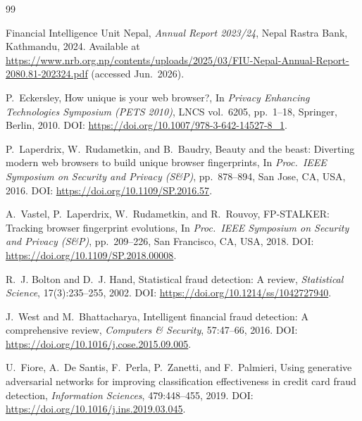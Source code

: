 {\small
\begin{thebibliography}{99}

\hypertarget{cite.fiu2024}{}
Financial Intelligence Unit Nepal,
\newblock \emph{Annual Report 2023/24},
\newblock Nepal Rastra Bank, Kathmandu, 2024.
\newblock Available at \url{https://www.nrb.org.np/contents/uploads/2025/03/FIU-Nepal-Annual-Report-2080.81-202324.pdf} (accessed Jun.\ 2026).

\hypertarget{cite.eckersley2010}{}
P.~Eckersley,
\newblock How unique is your web browser?,
\newblock In \emph{Privacy Enhancing Technologies Symposium (PETS 2010)}, LNCS vol.~6205, pp.~1--18, Springer, Berlin, 2010.
\newblock DOI: \url{https://doi.org/10.1007/978-3-642-14527-8_1}.

\hypertarget{cite.laperdrix2016}{}
P.~Laperdrix, W.~Rudametkin, and B.~Baudry,
\newblock Beauty and the beast: Diverting modern web browsers to build unique browser fingerprints,
\newblock In \emph{Proc.\ IEEE Symposium on Security and Privacy (S\&P)}, pp.~878--894, San Jose, CA, USA, 2016.
\newblock DOI: \url{https://doi.org/10.1109/SP.2016.57}.

\hypertarget{cite.vastel2018}{}
A.~Vastel, P.~Laperdrix, W.~Rudametkin, and R.~Rouvoy,
\newblock FP-STALKER: Tracking browser fingerprint evolutions,
\newblock In \emph{Proc.\ IEEE Symposium on Security and Privacy (S\&P)}, pp.~209--226, San Francisco, CA, USA, 2018.
\newblock DOI: \url{https://doi.org/10.1109/SP.2018.00008}.

\hypertarget{cite.bolton2002}{}
R.~J. Bolton and D.~J. Hand,
\newblock Statistical fraud detection: A review,
\newblock \emph{Statistical Science}, 17(3):235--255, 2002.
\newblock DOI: \url{https://doi.org/10.1214/ss/1042727940}.

\hypertarget{cite.west2016}{}
J.~West and M.~Bhattacharya,
\newblock Intelligent financial fraud detection: A comprehensive review,
\newblock \emph{Computers \& Security}, 57:47--66, 2016.
\newblock DOI: \url{https://doi.org/10.1016/j.cose.2015.09.005}.

\hypertarget{cite.fiore2019}{}
U.~Fiore, A.~De Santis, F.~Perla, P.~Zanetti, and F.~Palmieri,
\newblock Using generative adversarial networks for improving classification effectiveness in credit card fraud detection,
\newblock \emph{Information Sciences}, 479:448--455, 2019.
\newblock DOI: \url{https://doi.org/10.1016/j.ins.2019.03.045}.


\end{thebibliography}}

